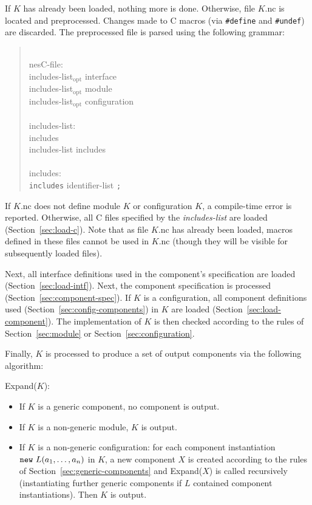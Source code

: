 \documentclass[11pt,letterpaper]{article}
\newcommand{\kw}[1]{{\tt #1}}
\newcommand{\code}[1]{{\tt #1}}
\newcommand{\opt}{$_{\mbox{opt}}$\xspace}
\newcommand{\grammarshift}{\vspace*{-.7cm}}
\newcommand{\grammarindent}{\hspace*{2cm}\= \\ \kill}
\begin{document}
If $K$ has already been loaded, nothing more is done. Otherwise, file
$K$.nc is located and preprocessed. Changes made to C macros (via
\code{\#define} and \code{\#undef}) are discarded. The preprocessed file is
parsed using the following grammar: \begin{quote} \grammarshift \em \begin{tabbing}
\grammarindent
nesC-file: \\
\>	includes-list\opt interface\\
\>	includes-list\opt module\\
\>	includes-list\opt configuration\\
\\
includes-list:\\
\>	includes\\
\>	includes-list includes\\
\\
includes:\\
\>	\kw{includes} identifier-list \kw{;}\\
\end{tabbing} \end{quote}
If $K$.nc does not define module $K$ or configuration $K$, a
compile-time error is reported. Otherwise, all C files specified by the
\emph{includes-list} are loaded (Section~\ref{sec:load-c}). Note that
as file $K$.nc has already been loaded, macros defined in these files cannot
be used in $K$.nc (though they will be visible for subsequently loaded files).

Next, all interface definitions used in the component's specification are
loaded (Section~\ref{sec:load-intf}). Next, the component specification is
processed (Section~\ref{sec:component-spec}). If $K$ is a configuration, all
component definitions used (Section~\ref{sec:config-components}) in $K$ are
loaded (Section~\ref{sec:load-component}). The implementation of $K$ is
then checked according to the rules of Section~\ref{sec:module} or
Section~\ref{sec:configuration}.

Finally, $K$ is processed to produce a set of output components via the
following algorithm:

Expand($K$):
\begin{itemize}
\item If $K$ is a generic component, no component is output.

\item If $K$ is a non-generic module, $K$ is output.

\item If $K$ is a non-generic configuration: for each component
instantiation $\kw{new}\ L(a_1, \ldots, a_n)$ in $K$, a new component $X$ is
created according to the rules of Section~\ref{sec:generic-components} and
Expand($X$) is called recursively (instantiating further generic components
if $L$ contained component instantiations). Then $K$ is output.
\end{itemize}
\end{document}
